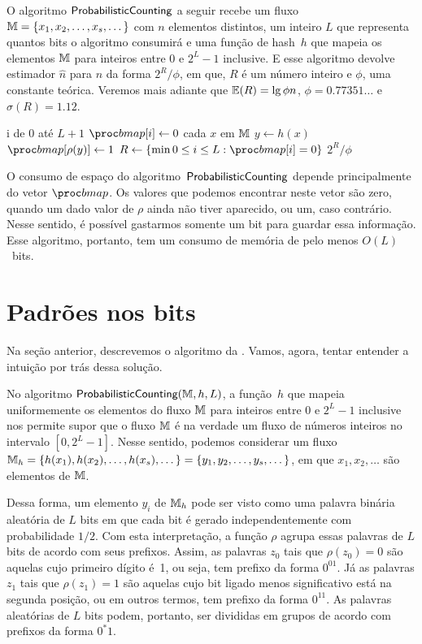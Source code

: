 O algoritmo $\textsf{ProbabilisticCounting}$ a seguir recebe um fluxo $\mathbb{M} = \{ x_1, x_2, \dots, x_s, \dots \}$ com $n$ elementos distintos, 
um inteiro $L$ que representa quantos bits o algoritmo consumirá e uma função de hash~$h$ que mapeia os elementos $\mathbb{M}$ 
para inteiros entre $0$ e $2^L - 1$ inclusive. E esse algoritmo devolve estimador $\hat{n}$ para $n$ da forma 
$2^{R}/\phi$, em que, $R$ é um número inteiro e $\phi$, uma constante teórica. Veremos mais adiante que 
$\mathbb{E}(R) = \lg \phi n$, $\phi = 0.77351{\dots}$ e $\sigma(R) = 1.12$.

\begin{codebox}
  \li \For i de $0$ até $L + 1$
      \Do
  \li    $\bitmap[i] \gets 0$
      \End
  \li \For cada $x$ em $\mathbb{M}$                               \label{li:pc:for:start}
      \Do
  \li   $y \gets h(x)$
  \li   $\bitmap[\rho(y)] \gets 1$                          \label{li:pc:for:end}
      \End
  \li $R \gets \{ \min 0 \leq i \leq L: \bitmap[i] = 0 \}$  \label{li:pc:r:def}
  \li\Return $2^R/\phi$
  \End
\end{codebox}

O consumo de espaço do algoritmo~$\textsf{ProbabilisticCounting}$ depende principalmente do vetor $\bitmap$. Os valores que podemos encontrar neste
vetor são zero, quando um dado valor de $\rho$ ainda não tiver aparecido, ou um, caso contrário. Nesse sentido, é 
possível gastarmos somente um bit para guardar essa informação. Esse algoritmo, portanto, tem um consumo de memória de 
pelo menos $O(L)$~bits.

\section{Padrões nos bits}
\label{sec:flajolet-martin:pattern}

Na seção anterior, descrevemos o algoritmo da . Vamos, agora, tentar entender a intuição
por trás dessa solução.

No algoritmo $\textsf{ProbabilisticCounting}(\mathbb{M}, h, L)$, a função~$h$ que mapeia uniformemente os elementos do fluxo $\mathbb{M}$ para inteiros entre 
$0$ e $2^L - 1$ inclusive nos permite supor que o fluxo $\mathbb{M}$ é na verdade um fluxo de números inteiros no intervalo 
$[0, 2^L - 1]$. Nesse sentido, podemos considerar um fluxo $\mathbb{M}_h = \{ h(x_1), h(x_2), \dots, h(x_s), \dots \} = 
\{ y_1, y_2, \dots, y_s, \dots \} $, em que $x_1, x_2, \dots$ são elementos de $\mathbb{M}$.

Dessa forma, um elemento $y_i$ de $\mathbb{M}_h$ pode ser visto como uma palavra binária aleatória de $L$ bits em que cada bit 
é gerado independentemente com probabilidade $1/2$. Com esta interpretação, a função $\rho$ agrupa essas palavras de $L$ 
bits de acordo com seus prefixos. Assim, as palavras $z_0$ tais que $\rho(z_0) = 0$ são aquelas cujo primeiro dígito 
é~1, ou seja, tem prefixo da forma $0^01$. Já as palavras $z_1$ tais que $\rho(z_1) = 1$ são aquelas cujo bit ligado 
menos significativo está na segunda posição, ou em outros termos, tem prefixo da forma $0^11$. As palavras aleatórias de 
$L$ bits podem, portanto, ser divididas em grupos de acordo com prefixos da forma $0^{*}1$.

